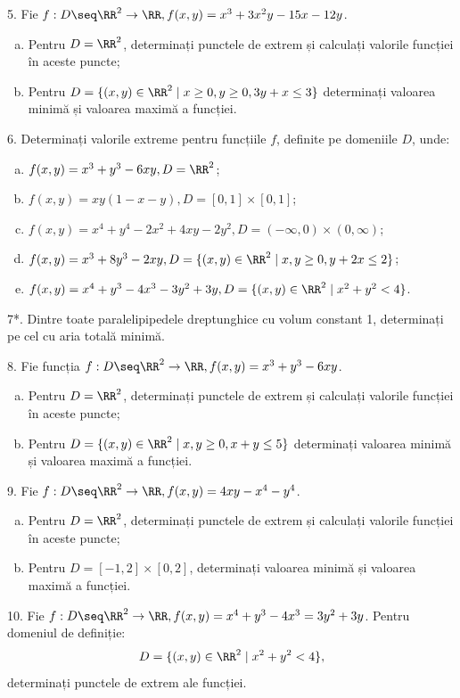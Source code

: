 \vspace{1cm}

5. Fie $f : D \seq \RR^2 \to \RR, f(x, y) = x^3 + 3x^2 y - 15x - 12 y$.
\begin{enumerate}[(a)]
\item Pentru $D = \RR^2$, determinați punctele de extrem și calculați
  valorile funcției în aceste puncte;
\item Pentru $D = \{ (x, y) \in \RR^2 \mid x \geq 0, y \geq 0, 3y + x \leq 3 \}$
  determinați valoarea minimă și valoarea maximă a funcției.
\end{enumerate}

\vspace{1cm}

6. Determinați valorile extreme pentru funcțiile $f$, definite pe domeniile $D$,
unde:
\begin{enumerate}[(a)]
\item $f(x, y) = x^3 + y^3 - 6xy, D = \RR^2$;
\item $f(x, y) = xy(1 - x - y), D = [0, 1] \times [0, 1]$;
\item $f(x, y) = x^4 + y^4 - 2x^2 + 4xy - 2y^2, D = (-\infty, 0) \times (0, \infty)$;
\item $f(x, y) = x^3 + 8y^3 - 2xy, D = \{(x, y) \in \RR^2 \mid x, y \geq 0, y + 2x \leq 2\}$;
\item $f(x, y) = x^4 + y^3 - 4x^3 - 3y^2 + 3y, D = \{ (x, y) \in \RR^2 \mid x^2 + y^2 < 4 \}$.
\end{enumerate}

\vspace{1cm}

7*. Dintre toate paralelipipedele dreptunghice cu volum constant 1, determinați
pe cel cu aria totală minimă.

\vspace{1cm}
8. Fie funcția $ f : D \seq \RR^2 \to \RR, f(x, y) = x^3 + y^3 - 6xy $.
\begin{enumerate}[(a)]
\item Pentru $ D = \RR^2 $, determinați punctele de extrem și calculați
  valorile funcției în aceste puncte;
\item Pentru $ D = \{ (x, y) \in \RR^2 \mid x, y \geq 0, x + y \leq 5 \} $
  determinați valoarea minimă și valoarea maximă a funcției.
\end{enumerate}

9. Fie $ f : D \seq \RR^2 \to \RR, f(x, y) = 4xy - x^4 - y^4 $.
\begin{enumerate}[(a)]
\item Pentru $ D = \RR^2 $, determinați punctele de extrem și calculați valorile
  funcției în aceste puncte;
\item Pentru $ D = [-1, 2] \times [0, 2] $, determinați valoarea minimă
  și valoarea maximă a funcției.
\end{enumerate}

10. Fie $ f : D \seq \RR^2 \to \RR, f(x, y) = x^4 + y^3 - 4x^3 = 3y^2 + 3y $.
Pentru domeniul de definiție:
\[
  D = \{(x, y) \in \RR^2 \mid x^2 + y^2 < 4 \},
\]
determinați punctele de extrem ale funcției.

